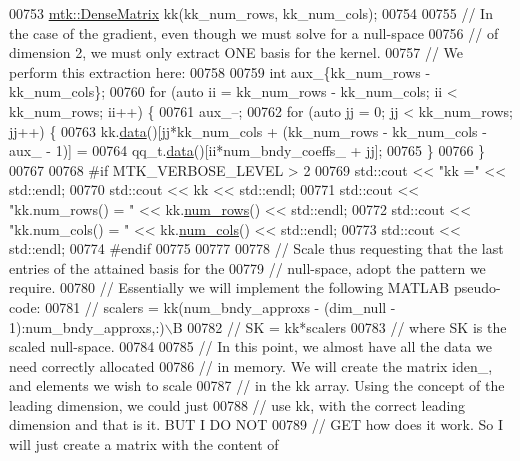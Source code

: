 \begin{DoxyCode}
{{00753   \hyperlink{classmtk_1_1DenseMatrix}{mtk::DenseMatrix} kk(kk\_num\_rows, kk\_num\_cols);
00754 
00755   \textcolor{comment}{// In the case of the gradient, even though we must solve for a null-space}
00756   \textcolor{comment}{// of dimension 2, we must only extract ONE basis for the kernel.}
00757   \textcolor{comment}{// We perform this extraction here:}
00758 
00759   \textcolor{keywordtype}{int} aux\_\{kk\_num\_rows - kk\_num\_cols\};
00760   \textcolor{keywordflow}{for} (\textcolor{keyword}{auto} ii = kk\_num\_rows - kk\_num\_cols; ii < kk\_num\_rows; ii++) \{
00761     aux\_--;
00762     \textcolor{keywordflow}{for} (\textcolor{keyword}{auto} jj = 0; jj < kk\_num\_rows; jj++) \{
00763       kk.\hyperlink{classmtk_1_1DenseMatrix_a0c33b8a9e01d157c61ddbdf807c25d84}{data}()[jj*kk\_num\_cols + (kk\_num\_rows - kk\_num\_cols - aux\_ - 1)] =
00764         qq\_t.\hyperlink{classmtk_1_1DenseMatrix_a0c33b8a9e01d157c61ddbdf807c25d84}{data}()[ii*num\_bndy\_coeffs\_ + jj];
00765     \}
00766   \}
00767 
00768 \textcolor{preprocessor}{  #if MTK\_VERBOSE\_LEVEL > 2}
00769   std::cout << \textcolor{stringliteral}{"kk ="} << std::endl;
00770   std::cout << kk << std::endl;
00771   std::cout << \textcolor{stringliteral}{"kk.num\_rows() = "} << kk.\hyperlink{classmtk_1_1DenseMatrix_a53f3afb3b6a8d21854458aaa9663cc74}{num\_rows}() << std::endl;
00772   std::cout << \textcolor{stringliteral}{"kk.num\_cols() = "} << kk.\hyperlink{classmtk_1_1DenseMatrix_a41747502d468c6728a4be31501b16e0e}{num\_cols}() << std::endl;
00773   std::cout << std::endl;
00774 \textcolor{preprocessor}{  #endif}
00775 
00777 
00778   \textcolor{comment}{// Scale thus requesting that the last entries of the attained basis for the}
00779   \textcolor{comment}{// null-space, adopt the pattern we require.}
00780   \textcolor{comment}{// Essentially we will implement the following MATLAB pseudo-code:}
00781   \textcolor{comment}{//  scalers = kk(num\_bndy\_approxs - (dim\_null - 1):num\_bndy\_approxs,:)\(\backslash\)B}
00782   \textcolor{comment}{//  SK = kk*scalers}
00783   \textcolor{comment}{// where SK is the scaled null-space.}
00784 
00785   \textcolor{comment}{// In this point, we almost have all the data we need correctly allocated}
00786   \textcolor{comment}{// in memory. We will create the matrix iden\_, and elements we wish to scale}
00787   \textcolor{comment}{// in the kk array. Using the concept of the leading dimension, we could just}
00788   \textcolor{comment}{// use kk, with the correct leading dimension and that is it. BUT I DO NOT}
00789   \textcolor{comment}{// GET how does it work. So I will just create a matrix with the content of}
}}
\end{DoxyCode}
